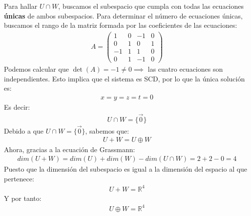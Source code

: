\documentclass{article}
\begin{document}
Para hallar $U \cap W$, buscamos el subespacio que cumpla con todas las ecuaciones \textbf{únicas} de ambos subespacios. Para determinar
el número de ecuaciones únicas, buscamos el rango de la matriz formada por las coeficientes de las ecuaciones:
\begin{equation}
    \begin{split}
        A = \begin{pmatrix}
        1 & 0 & -1 & 0\\0 & 1 & 0 & 1\\-1 & 1 & 1 & 0\\0 & 1 & -1 & 0
        \end{pmatrix}
    \end{split}
\end{equation}
Podemos calcular que $\det (A)=-1 \neq 0 \implies $ las cuatro ecuaciones son independientes. Esto implica que el sistema es SCD, por lo
que la única solución es:
\begin{equation}
    \begin{split}
        x = y = z = t = 0
    \end{split}
\end{equation}
Es decir:
\begin{equation}
    \begin{split}
        U \cap W = \{ \vec{0} \}
    \end{split}
\end{equation}
Debido a que $U \cap W = \{ \vec{0} \}$, sabemos que:
\begin{equation}
    \begin{split}
        U+W = U \oplus W
    \end{split}
\end{equation}
Ahora, gracias a la ecuación de Grassmann:
\begin{equation}
    \begin{split}
        dim(U+W) = dim(U) + dim(W) - dim(U\cap W) = 2 + 2 -0 = 4
    \end{split}
\end{equation}
Puesto que la dimensión del subespacio es igual a la dimensión del espacio al que pertenece:
\begin{equation}
    \begin{split}
        U + W = \mathbb{R}^4
    \end{split}
\end{equation}
Y por tanto:
\begin{equation}
    \begin{split}
        U \oplus W = \mathbb{R}^4
    \end{split}
\end{equation}
\end{document}
